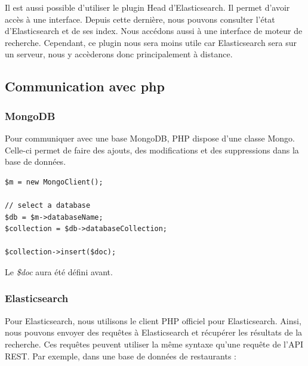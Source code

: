 Il est aussi possible d’utiliser le plugin Head d’Elasticsearch. Il permet d’avoir accès à une interface. Depuis cette dernière, nous pouvons consulter l’état d’Elasticsearch et de ses index. Nous accédons aussi à une interface de moteur de recherche. Cependant, ce plugin nous sera moins utile car Elasticsearch sera sur un serveur, nous y accèderons donc principalement à distance.

\subsection{Communication avec php}
\subsubsection{MongoDB}

Pour communiquer avec une base MongoDB, PHP dispose d’une classe Mongo. Celle-ci permet de faire des ajouts, des modifications et des suppressions dans la base de données. 

\begin{verbatim}
$m = new MongoClient();

// select a database
$db = $m->databaseName;   
$collection = $db->databaseCollection;

$collection->insert($doc);
\end{verbatim}

Le \textit{\$doc} aura été défini avant.

\subsubsection{Elasticsearch}

Pour Elasticsearch, nous utilisons le client PHP officiel pour Elasticsearch. Ainsi, nous pouvons envoyer des requêtes à Elasticsearch et récupérer les résultats de la recherche. Ces requêtes peuvent utiliser la même syntaxe qu’une requête de l’API REST. Par exemple, dans une base de données de restaurants :


